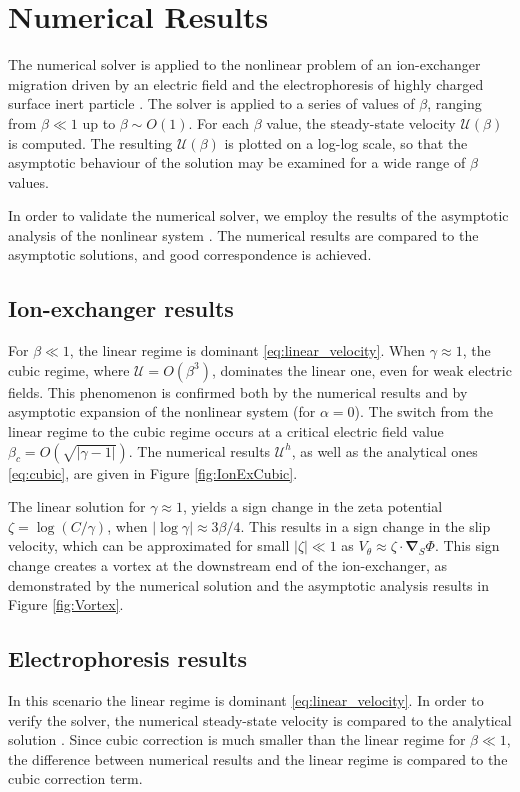 \documentclass[10pt]{ijnam}
\newcommand\bnabla{\boldsymbol{\nabla}}
\newcommand\cU{\mathscr{U}}
\begin{document}
\section{Numerical Results} \label{sec:results}
The numerical solver is applied to the nonlinear problem of an ion-exchanger migration 
driven by an electric field \cite{yariv2010migration}
and the electrophoresis of highly charged surface inert particle 
\cite{schnitzer2012surface}. 
The solver is applied to a series of values of $\beta$, ranging 
from $\beta \ll 1$ up to $\beta \sim O(1)$.
For each $\beta$ value, the steady-state velocity $\cU(\beta)$ is computed. 
The resulting $\cU(\beta)$ is plotted on a log-log scale, so that the asymptotic behaviour
of the solution may be examined for a wide range of $\beta$ values.

In order to validate the numerical solver, we employ 
the results of the asymptotic analysis of the nonlinear 
system \cite{zeyde2012report, schnitzer2012cubic}. 
The numerical results are compared 
to the asymptotic solutions, and good correspondence is achieved.

\subsection{Ion-exchanger results}
For $\beta \ll 1$, the linear regime is dominant \eqref{eq:linear_velocity}.
When $\gamma \approx 1$, the cubic regime, where $\cU = O(\beta^3)$, 
dominates the linear one, even for weak electric fields. 
This phenomenon is confirmed both by the numerical
results and by asymptotic expansion of the nonlinear system (for $\alpha=0$).
The switch from the linear regime to the cubic regime occurs at a critical electric
field value $\beta_c = O(\sqrt{|\gamma - 1|})$.
The numerical results $\cU^h$, 
as well as the analytical ones \eqref{eq:cubic}, are given in Figure \ref{fig:IonExCubic}.

The linear solution for $\gamma \approx 1$, 
yields a sign change in the zeta potential $\zeta = \log (C/\gamma)$, when
$|\log\gamma| \approx 3\beta / 4$. This results in a sign change in the slip velocity,
which can be approximated for small $|\zeta| \ll 1$ as $V_\theta \approx \zeta \cdot \bnabla_S \varPhi$.
This sign change creates a vortex at the downstream end of the ion-exchanger, 
as demonstrated by the numerical solution and the asymptotic analysis results 
in Figure \ref{fig:Vortex}.

\subsection{Electrophoresis results}
In this scenario the linear regime is dominant \eqref{eq:linear_velocity}.
In order to verify the solver, the numerical steady-state velocity is compared to the
analytical solution \cite{schnitzer2012cubic}. Since cubic correction is much smaller than
the linear regime for $\beta \ll 1$, the difference between numerical results and
the linear regime is compared to the cubic correction term. 
\end{document}
